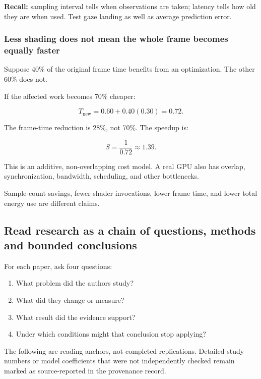 \textbf{Recall:} sampling interval tells when observations are taken; latency tells how old they are when used. Test gaze landing as well as average prediction error.

\subsubsection{Less shading does not mean the whole frame becomes equally faster}\label{04-visual-computing-ii-ch043-less-shading-does-not-mean-the-whole-frame-becomes-equally-faster}

Suppose 40\% of the original frame time benefits from an optimization. The other 60\% does not.

If the affected work becomes 70\% cheaper:

\[
T_{\mathrm{new}}=0.60+0.40(0.30)=0.72.
\]

The frame-time reduction is 28\%, not 70\%. The speedup is:

\[
S=\frac1{0.72}\approx1.39.
\]

This is an additive, non-overlapping cost model. A real GPU also has overlap, synchronization, bandwidth, scheduling, and other bottlenecks.

Sample-count savings, fewer shader invocations, lower frame time, and lower total energy use are different claims.

\subsection{Read research as a chain of questions, methods and bounded conclusions}\label{04-visual-computing-ii-ch043-read-research-as-a-chain-of-questions-methods-and-bounded-conclusions}

For each paper, ask four questions:

\begin{enumerate}
\def\labelenumi{\arabic{enumi}.}
\tightlist
\item
  What problem did the authors study?
\item
  What did they change or measure?
\item
  What result did the evidence support?
\item
  Under which conditions might that conclusion stop applying?
\end{enumerate}

The following are reading anchors, not completed replications. Detailed study numbers or model coefficients that were not independently checked remain marked as source-reported in the provenance record.

